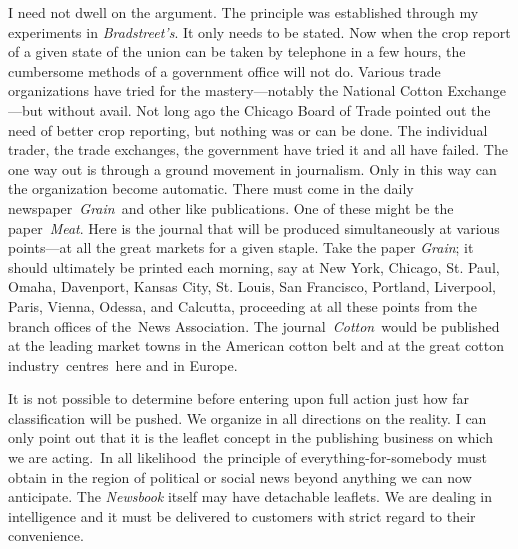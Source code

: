 \documentclass[twoside,symmetric,nobib,justified]{tufte-book}
\begin{document}
I need not dwell on the argument. The principle was established through
my experiments in \emph{Bradstreet's}. It only needs to be stated. Now
when the crop report of a given state of the union can be taken by
telephone in a few hours, the cumbersome methods of a government office
will not do. Various trade organizations have tried for the
mastery---notably the National Cotton Exchange ---but without avail. Not
long ago the Chicago Board of Trade pointed out the need of better crop
reporting, but nothing was or can be done. The individual trader, the
trade exchanges, the government have tried it and all have failed. The
one way out is through a ground movement in journalism. Only in this way
can the organization become automatic. There must come in the daily
newspaper~\emph{Grain}~and other like publications. One of these might
be the paper~\emph{Meat}. Here is the journal that will be produced
simultaneously at various points---at all the great markets for a given
staple. Take the paper \emph{Grain}; it should ultimately be printed
each morning, say at New York, Chicago, St. Paul, Omaha, Davenport,
Kansas City, St. Louis, San Francisco, Portland, Liverpool, Paris,
Vienna, Odessa, and Calcutta, proceeding at all these points from the
branch offices of the~News Association. The journal~\emph{Cotton}~would
be published at the leading market towns in the American cotton belt and
at the great cotton industry~centres~here and in Europe.~

It is not possible to determine before entering upon full action just
how far classification will be pushed. We organize in all directions on
the reality. I can only point out that it is the leaflet concept in the
publishing business on which we are acting.~In all likelihood~the
principle of everything-for-somebody must obtain in the region of
political or social news beyond anything we can now anticipate. The
\emph{Newsbook} itself may have detachable leaflets. We are dealing in
intelligence and it must be delivered to customers with strict regard to
their convenience.~
\end{document}
